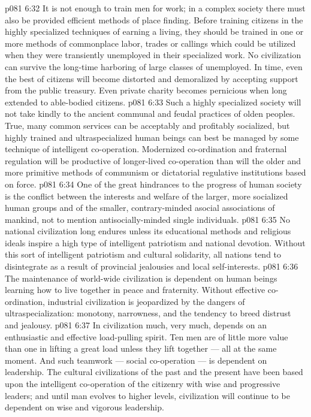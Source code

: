 \vs p081 6:32 It is not enough to train men for work; in a complex society there must also be provided efficient methods of place finding. Before training citizens in the highly specialized techniques of earning a living, they should be trained in one or more methods of commonplace labor, trades or callings which could be utilized when they were transiently unemployed in their specialized work. No civilization can survive the long\hyp{}time harboring of large classes of unemployed. In time, even the best of citizens will become distorted and demoralized by accepting support from the public treasury. Even private charity becomes pernicious when long extended to able\hyp{}bodied citizens.
\vs p081 6:33 Such a highly specialized society will not take kindly to the ancient communal and feudal practices of olden peoples. True, many common services can be acceptably and profitably socialized, but highly trained and ultraspecialized human beings can best be managed by some technique of intelligent co\hyp{}operation. Modernized co\hyp{}ordination and fraternal regulation will be productive of longer\hyp{}lived co\hyp{}operation than will the older and more primitive methods of communism or dictatorial regulative institutions based on force.
\vs p081 6:34 \pc {}\bibnobreakspace {} One of the great hindrances to the progress of human society is the conflict between the interests and welfare of the larger, more socialized human groups and of the smaller, contrary\hyp{}minded asocial associations of mankind, not to mention antisocially\hyp{}minded single individuals.
\vs p081 6:35 No national civilization long endures unless its educational methods and religious ideals inspire a high type of intelligent patriotism and national devotion. Without this sort of intelligent patriotism and cultural solidarity, all nations tend to disintegrate as a result of provincial jealousies and local self\hyp{}interests.
\vs p081 6:36 The maintenance of world\hyp{}wide civilization is dependent on human beings learning how to live together in peace and fraternity. Without effective co\hyp{}ordination, industrial civilization is jeopardized by the dangers of ultraspecialization: monotony, narrowness, and the tendency to breed distrust and jealousy.
\vs p081 6:37 \pc {}\bibnobreakspace {} In civilization much, very much, depends on an enthusiastic and effective load\hyp{}pulling spirit. Ten men are of little more value than one in lifting a great load unless they lift together --- all at the same moment. And such teamwork --- social co\hyp{}operation --- is dependent on leadership. The cultural civilizations of the past and the present have been based upon the intelligent co\hyp{}operation of the citizenry with wise and progressive leaders; and until man evolves to higher levels, civilization will continue to be dependent on wise and vigorous leadership.
